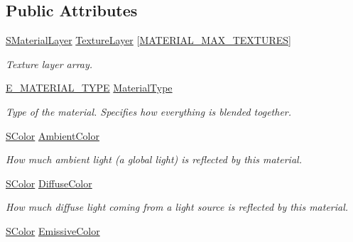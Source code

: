 \subsection*{Public Attributes}
\begin{DoxyCompactItemize}
\item 
\hyperlink{classirr_1_1video_1_1SMaterialLayer}{S\+Material\+Layer} \hyperlink{classirr_1_1video_1_1SMaterial_a2a722a68bcc2cb3e779882785a409890}{Texture\+Layer} \mbox{[}\hyperlink{namespaceirr_1_1video_ad41ca808200ca2e8e9d9326355020052}{M\+A\+T\+E\+R\+I\+A\+L\+\_\+\+M\+A\+X\+\_\+\+T\+E\+X\+T\+U\+R\+ES}\mbox{]}\hypertarget{classirr_1_1video_1_1SMaterial_a2a722a68bcc2cb3e779882785a409890}{}\label{classirr_1_1video_1_1SMaterial_a2a722a68bcc2cb3e779882785a409890}

\begin{DoxyCompactList}\small\item\em Texture layer array. \end{DoxyCompactList}\item 
\hyperlink{namespaceirr_1_1video_ac8e9b6c66f7cebabd1a6d30cbc5430f1}{E\+\_\+\+M\+A\+T\+E\+R\+I\+A\+L\+\_\+\+T\+Y\+PE} \hyperlink{classirr_1_1video_1_1SMaterial_a8cb63ab4b49ae1c61fbca8353e6b2f8a}{Material\+Type}\hypertarget{classirr_1_1video_1_1SMaterial_a8cb63ab4b49ae1c61fbca8353e6b2f8a}{}\label{classirr_1_1video_1_1SMaterial_a8cb63ab4b49ae1c61fbca8353e6b2f8a}

\begin{DoxyCompactList}\small\item\em Type of the material. Specifies how everything is blended together. \end{DoxyCompactList}\item 
\hyperlink{classirr_1_1video_1_1SColor}{S\+Color} \hyperlink{classirr_1_1video_1_1SMaterial_a434c189b7c618c66f4d09118d30e6b4b}{Ambient\+Color}
\begin{DoxyCompactList}\small\item\em How much ambient light (a global light) is reflected by this material. \end{DoxyCompactList}\item 
\hyperlink{classirr_1_1video_1_1SColor}{S\+Color} \hyperlink{classirr_1_1video_1_1SMaterial_ac4e1aaf4751f7267eaf255496cc058df}{Diffuse\+Color}
\begin{DoxyCompactList}\small\item\em How much diffuse light coming from a light source is reflected by this material. \end{DoxyCompactList}\item 
\hyperlink{classirr_1_1video_1_1SColor}{S\+Color} \hyperlink{classirr_1_1video_1_1SMaterial_a005f9acf8855681c21b3e3e7de67306f}{Emissive\+Color}\hypertarget{classirr_1_1video_1_1SMaterial_a005f9acf8855681c21b3e3e7de67306f}{}\label{classirr_1_1video_1_1SMaterial_a005f9acf8855681c21b3e3e7de67306f}


\end{DoxyCompactItemize}
